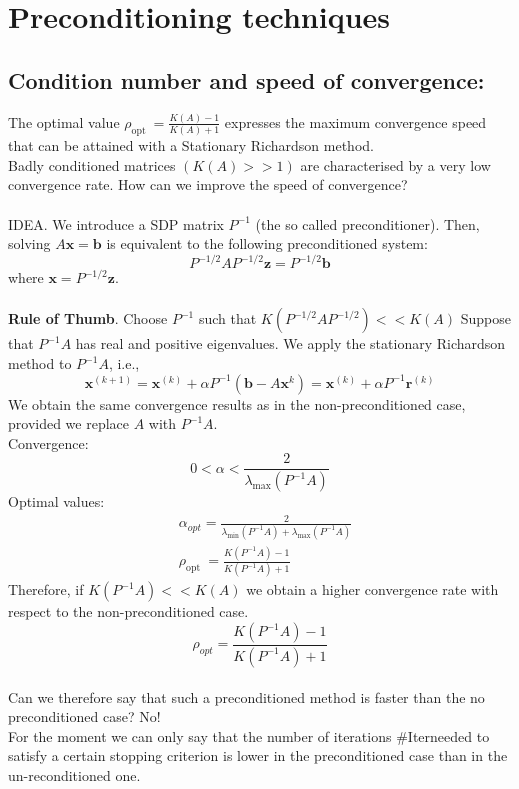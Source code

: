 \documentclass[11pt]{book}
\begin{document}
\section*{Preconditioning techniques}
\subsection*{Condition number and speed of convergence:}
The optimal value $\rho_{\text {opt }}=\frac{K(A)-1}{K(A)+1}$ expresses the maximum convergence speed that can be attained with a Stationary Richardson method.\\
Badly conditioned matrices $(K(A)>>1)$ are characterised by a very low convergence rate. How can we improve the speed of convergence?\\ \\
IDEA. We introduce a SDP matrix $P^{-1}$ (the so called preconditioner). Then, solving $A \mathbf{x}=\mathbf{b}$ is equivalent to the following preconditioned system:
$$
P^{-1 / 2} A P^{-1 / 2} \mathbf{z}=P^{-1 / 2} \mathbf{b}
$$
where $\mathbf{x}=P^{-1 / 2} \mathbf{z}$.\\ \\
\textbf{Rule of Thumb}. Choose $P^{-1}$ such that $K\left(P^{-1 / 2} A P^{-1 / 2}\right)<<K(A)$ Suppose that $P^{-1} A$ has real and positive eigenvalues. We apply the stationary Richardson method to $P^{-1} A$, i.e.,
$$
\boldsymbol{x}^{(k+1)}=\boldsymbol{x}^{(k)}+\alpha P^{-1}\left(\boldsymbol{b}-A \boldsymbol{x}^{k}\right)=\boldsymbol{x}^{(k)}+\alpha P^{-1} \boldsymbol{r}^{(k)}
$$
We obtain the same convergence results as in the non-preconditioned case, provided we replace $A$ with $P^{-1} A$. \\
Convergence:
$$
0<\alpha<\frac{2}{\lambda_{\max }\left(P^{-1} A\right)}
$$
Optimal values:
$$
\begin{aligned}
& \alpha_{o p t}=\frac{2}{\lambda_{\min }\left(P^{-1} A\right)+\lambda_{\max }\left(P^{-1} A\right)} \\
& \rho_{\text {opt }}=\frac{K\left(P^{-1} A\right)-1}{K\left(P^{-1} A\right)+1}
\end{aligned}
$$
Therefore, if $K\left(P^{-1} A\right)<<K(A)$ we obtain a higher convergence rate with respect to the non-preconditioned case.
$$
\rho_{o p t}=\frac{K\left(P^{-1} A\right)-1}{K\left(P^{-1} A\right)+1}
$$\\
Can we therefore say that such a preconditioned method is faster than the no preconditioned case? No!\\
For the moment we can only say that the number of iterations \#Iterneeded to satisfy a certain stopping criterion is lower in the preconditioned case than in the un-reconditioned one.\\ \\
\end{document}
